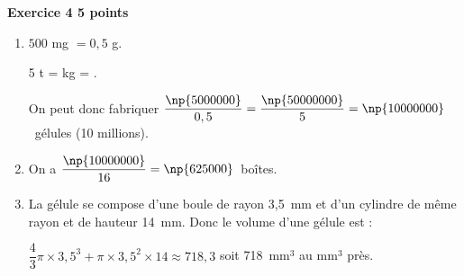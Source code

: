 \textbf{Exercice 4 \hfill 5 points}

\medskip 

%
%
%
%

\begin{enumerate}
\item %

$500$ mg $= 0,5$ g.

5 t =  kg = .

On peut donc fabriquer $\dfrac{\np{5000000}}{0,5} = \dfrac{\np{50000000}}{5} = \np{10000000}$~gélules (10 millions). 
\item %
On a $\dfrac{\np{10000000}}{16} = \np{625000}$~boîtes. 
\item %

La gélule se compose d'une boule de rayon 3,5~mm et d'un cylindre de même rayon et de hauteur 14~mm. Donc le volume d'une gélule est :

$\dfrac{4}{3}\pi \times 3,5^3 + \pi\times 3,5^2 \times 14 \approx 718,3$ soit 718~mm$^3$ au mm$^3$ près. 
\end{enumerate}

\bigskip

